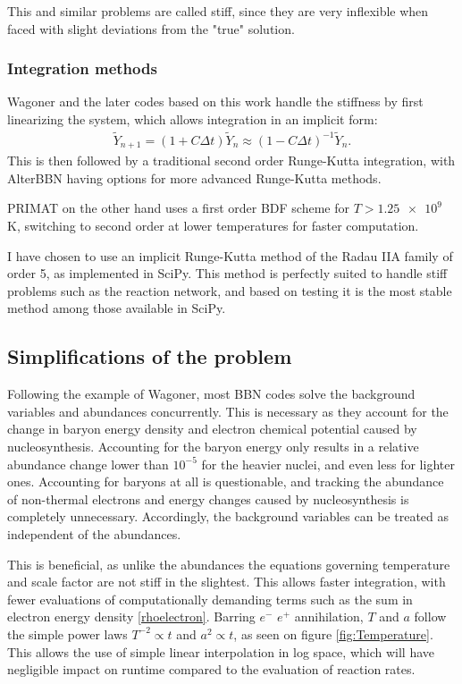 This and similar problems are called stiff, since they are very inflexible when faced with slight deviations from the "true" solution. 


\subsubsection{Integration methods}

Wagoner and the later codes based on this work handle the stiffness by first linearizing the system, which allows integration in an implicit form:
\begin{align}
    \tilde{Y}_{n+1}=(1+C \Delta t)\tilde{Y}_{n}\approx(1-C \Delta t)^{-1}\tilde{Y}_{n}.
\end{align}
This is then followed by a traditional second order Runge-Kutta integration, with AlterBBN having options for more advanced Runge-Kutta methods. 

PRIMAT on the other hand uses a first order BDF scheme for $T>\num{1.25e9}$ K, switching to second order at lower temperatures for faster computation.

I have chosen to use an implicit Runge-Kutta method of the Radau IIA family of order 5, as implemented in SciPy. This method is perfectly suited to handle stiff problems such as the reaction network, and based on testing it is the most stable method among those available in SciPy.

\subsection{Simplifications of the problem}
Following the example of Wagoner, most BBN codes solve the background variables and abundances concurrently. This is necessary as they account for the change in baryon energy density and electron chemical potential caused by nucleosynthesis. Accounting for the baryon energy only results in a relative abundance change lower than $10^{-5}$ for the heavier nuclei, and even less for lighter ones. Accounting for baryons at all is questionable, and tracking the abundance of non-thermal electrons and energy changes caused by nucleosynthesis is completely unnecessary. Accordingly, the background variables can be treated as independent of the abundances.

This is beneficial, as unlike the abundances the equations governing temperature and scale factor are not stiff in the slightest. This allows faster integration, with fewer evaluations of computationally demanding terms such as the sum in electron energy density \eqref{rhoelectron}. Barring $e^-$ $e^+$ annihilation, $T$ and $a$ follow the simple power laws $T^{-2}\propto t$ and $a^2\propto t$, as seen on figure \ref{fig:Temperature}. This allows the use of simple linear interpolation in log space, which will have negligible impact on runtime compared to the evaluation of reaction rates.

